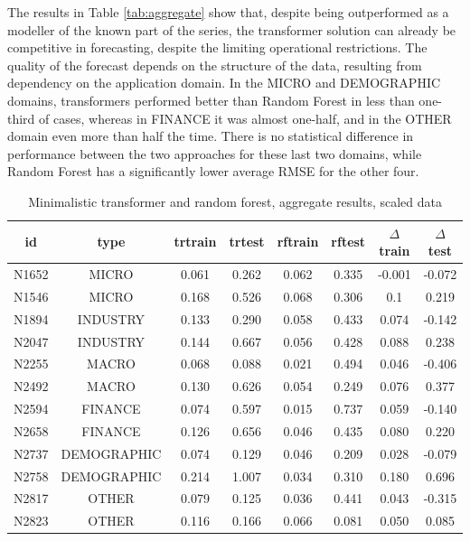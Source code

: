 \documentclass[algorithms,article,submit,pdftex,moreauthors]{Definitions/mdpi}
\begin{document}
The results in Table \ref{tab:aggregate}  show that, despite being outperformed as a modeller of the known part of the series, the transformer solution can already be competitive in forecasting, despite the limiting operational restrictions. The quality of the forecast depends on the structure of the data, resulting from dependency on the application domain. In the MICRO and DEMOGRAPHIC domains, transformers performed better than Random Forest in less than one-third of cases, whereas in FINANCE it was almost one-half, and in the OTHER domain even more than half the time. There is no statistical difference in performance between the two approaches for these last two domains, while Random Forest has a significantly lower average RMSE for the other four.


\begin{table}[H]
\caption{Minimalistic transformer and random forest, aggregate results, scaled data}
\label{tab:bestworse}
\centering
\begin{tabular}{cccccccc}
\toprule
id   & type        & trtrain & trtest & rftrain & rftest & $\Delta$train & $\Delta$test\\
\midrule
N1652 & MICRO       & 0.061 & 0.262 & 0.062 & 0.335 & -0.001 &-0.072\\
N1546 & MICRO       & 0.168 & 0.526 & 0.068 & 0.306 & 0.1   &  0.219\\
N1894 & INDUSTRY    & 0.133 & 0.290 & 0.058 & 0.433 & 0.074 & -0.142\\
N2047 & INDUSTRY    & 0.144 & 0.667 & 0.056 & 0.428 & 0.088 &  0.238\\
N2255 & MACRO       & 0.068 & 0.088 & 0.021 & 0.494 & 0.046 & -0.406\\
N2492 & MACRO       & 0.130 & 0.626 & 0.054 & 0.249 & 0.076 &  0.377\\
N2594 & FINANCE     & 0.074 & 0.597 & 0.015 & 0.737 & 0.059 & -0.140\\
N2658 & FINANCE     & 0.126 & 0.656 & 0.046 & 0.435 & 0.080 &  0.220\\
N2737 & DEMOGRAPHIC & 0.074 & 0.129 & 0.046 & 0.209 & 0.028 & -0.079\\
N2758 & DEMOGRAPHIC & 0.214 & 1.007 & 0.034 & 0.310 & 0.180 &  0.696\\
N2817 & OTHER       & 0.079 & 0.125 & 0.036 & 0.441 & 0.043 & -0.315\\
N2823 & OTHER       & 0.116 & 0.166 & 0.066 & 0.081 & 0.050 &  0.085\\
\bottomrule
\end{tabular}
\end{table}
\end{document}
